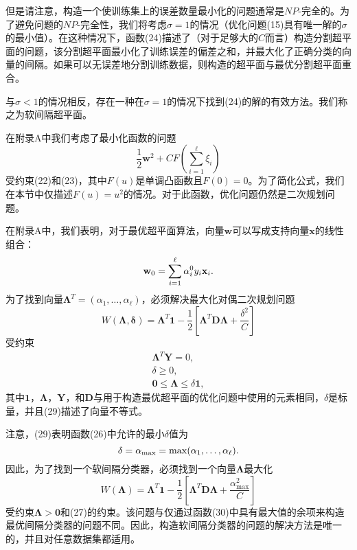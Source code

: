 \documentclass[lang=cn,11pt,a4paper]{elegantpaper}
\begin{document}
	但是请注意，构造一个使训练集上的误差数量最小化的问题通常是$NP$-完全的。为了避免问题的$NP$-完全性，我们将考虑$\sigma=1$的情况（优化问题(15)具有唯一解的$\sigma$的最小值）。在这种情况下，函数(24)描述了（对于足够大的$C$而言）构造分割超平面的问题，该分割超平面最小化了训练误差的偏差之和，并最大化了正确分类的向量的间隔。如果可以无误差地分割训练数据，则构造的超平面与最优分割超平面重合。

	与$\sigma<1$的情况相反，存在一种在$\sigma=1$的情况下找到(24)的解的有效方法。我们称之为软间隔超平面。

	在附录A中我们考虑了最小化函数的问题
	\begin{equation}
		\frac{1}{2}\mathbf{w}^2+CF\left(\sum_{i=1}^{\ell}\xi_i\right)\tag{25}
	\end{equation}
	受约束(22)和(23)，其中$F(u)$是单调凸函数且$F(0)=0$。为了简化公式，我们在本节中仅描述$F(u)=u^2$的情况。对于此函数，优化问题仍然是二次规划问题。

	在附录A中，我们表明，对于最优超平面算法，向量$\mathbf{w}$可以写成支持向量$\mathbf{x}$的线性组合：
	\begin{equation}
		\mathbf{w}_0=\sum_{i=1}^{\ell}\alpha_i^0y_i\mathbf{x}_i.\notag
	\end{equation}
	为了找到向量$\mathbf{\Lambda}^T=(\alpha_1,\dots,\alpha_{\ell})$，必须解决最大化对偶二次规划问题
	\begin{equation}
		W(\mathbf{\Lambda,\delta})=\mathbf{\Lambda}^T\mathbf{1}-\frac{1}{2}\left[\mathbf{\Lambda}^T\mathbf{D\Lambda}+\frac{\delta^2}{C}\right]\tag{26}
	\end{equation}
	受约束
	\begin{align}
		\mathbf{\Lambda}^T\mathbf{Y}=0,\tag{27} \\
		\delta\geq0,\tag{28} \\
		\mathbf{0}\leq\mathbf{\Lambda}\leq\delta\mathbf{1},\tag{29}
	\end{align}
	其中$\mathbf{1}$，$\mathbf{\Lambda}$，$\mathbf{Y}$，和$\mathbf{D}$与用于构造最优超平面的优化问题中使用的元素相同，$\delta$是标量，并且(29)描述了向量不等式。

	注意，(29)表明函数(26)中允许的最小$\delta$值为
	\begin{equation}
		\delta=\alpha_\mathrm{max}=\max(\alpha_1,\dots,\alpha_{\ell}).\notag
	\end{equation}
	因此，为了找到一个软间隔分类器，必须找到一个向量$\mathbf{\Lambda}$最大化
	\begin{equation}
		W(\mathbf{\Lambda})=\mathbf{\Lambda}^T\mathbf{1}-\frac{1}{2}\left[\mathbf{\Lambda}^T\mathbf{D\Lambda}+\frac{\alpha_{\mathrm{max}}^2}{C}\right]\tag{30}
	\end{equation}
	受约束$\mathbf{\Lambda}>\mathbf{0}$和(27)的约束。该问题与仅通过函数(30)中具有最大值的余项来构造最优间隔分类器的问题不同。因此，构造软间隔分类器的问题的解决方法是唯一的，并且对任意数据集都适用。
\end{document}
